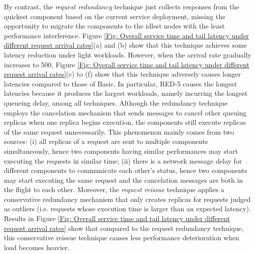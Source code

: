 \documentclass[10pt, conference, compsocconf]{IEEEtran}
\begin{document}
By contrast, the \emph{request redundancy} technique just collects responses from the quickest component based on the current service deployment, missing the opportunity to migrate the components to the idlest nodes with the least performance interference. Figure \ref{Fig: Overall service time and tail latency under different request arrival rates}(a) and (b) show that this technique achieves some latency reduction under light workloads. However, when the arrival rate gradually increases to 500, Figure \ref{Fig: Overall service time and tail latency under different request arrival rates}(c) to (f) show that this technique adversely causes longer latencies compared to those of Basic. In particular, RED-5 causes the longest latencies because it produces the largest workloads, namely incurring the longest queueing delay, among all techniques.
Although the redundancy technique employs the cancelation mechanism that sends messages to cancel other queuing replicas when one replica begins execution, the components still execute replicas of the same request unnecessarily. This phenomenon mainly comes from two sources: (i) all replicas of a request are sent to multiple components simultaneously, hence two components having similar performances may start executing the requests in similar time; (ii) there is a network message delay for different components to communicate each other's status, hence two components may start executing the same request and the cancelation messages are both in the flight to each other.
Moreover, the \emph{request reissue} technique applies a conservative redundancy mechanism that only creates replicas for requests judged as outliers (i.e. requests whose execution time is larger than an expected latency). Results in Figure \ref{Fig: Overall service time and tail latency under different request arrival rates} show that compared to the request redundancy technique, this conservative reissue technique causes less performance deterioration when load becomes heavier.
\end{document}
